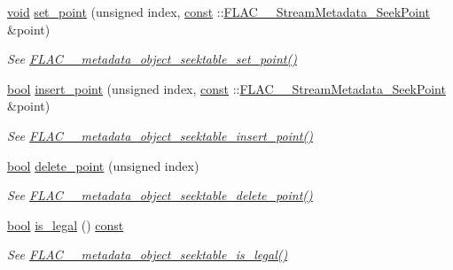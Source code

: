\begin{DoxyCompactItemize}
\hyperlink{sound_8c_ae35f5844602719cf66324f4de2a658b3}{void} \hyperlink{class_f_l_a_c_1_1_metadata_1_1_seek_table_a992aa37cd6a781b3e1f64a2d1d982229}{set\+\_\+point} (unsigned index, \hyperlink{getopt1_8c_a2c212835823e3c54a8ab6d95c652660e}{const} \+::\hyperlink{struct_f_l_a_c_____stream_metadata___seek_point}{F\+L\+A\+C\+\_\+\+\_\+\+Stream\+Metadata\+\_\+\+Seek\+Point} \&point)
\begin{DoxyCompactList}\small\item\em See \hyperlink{group__flac__metadata__object_gae2c58ebdfb9f2b238d45971b14600944}{F\+L\+A\+C\+\_\+\+\_\+metadata\+\_\+object\+\_\+seektable\+\_\+set\+\_\+point()} \end{DoxyCompactList}\item 
\hyperlink{mac_2config_2i386_2lib-src_2libsoxr_2soxr-config_8h_abb452686968e48b67397da5f97445f5b}{bool} \hyperlink{class_f_l_a_c_1_1_metadata_1_1_seek_table_a688ee146faf497ef96e953008adcc95a}{insert\+\_\+point} (unsigned index, \hyperlink{getopt1_8c_a2c212835823e3c54a8ab6d95c652660e}{const} \+::\hyperlink{struct_f_l_a_c_____stream_metadata___seek_point}{F\+L\+A\+C\+\_\+\+\_\+\+Stream\+Metadata\+\_\+\+Seek\+Point} \&point)
\begin{DoxyCompactList}\small\item\em See \hyperlink{group__flac__metadata__object_ga0c658260aaffb126486f5d1e211b53e5}{F\+L\+A\+C\+\_\+\+\_\+metadata\+\_\+object\+\_\+seektable\+\_\+insert\+\_\+point()} \end{DoxyCompactList}\item 
\hyperlink{mac_2config_2i386_2lib-src_2libsoxr_2soxr-config_8h_abb452686968e48b67397da5f97445f5b}{bool} \hyperlink{class_f_l_a_c_1_1_metadata_1_1_seek_table_af5962d076051a3e46379475c3f2b4fa8}{delete\+\_\+point} (unsigned index)
\begin{DoxyCompactList}\small\item\em See \hyperlink{group__flac__metadata__object_ga5a865f792845cbf22b5935c3d96568d1}{F\+L\+A\+C\+\_\+\+\_\+metadata\+\_\+object\+\_\+seektable\+\_\+delete\+\_\+point()} \end{DoxyCompactList}\item 
\hyperlink{mac_2config_2i386_2lib-src_2libsoxr_2soxr-config_8h_abb452686968e48b67397da5f97445f5b}{bool} \hyperlink{class_f_l_a_c_1_1_metadata_1_1_seek_table_aa98d82380ed3c33e1090edbf444fa280}{is\+\_\+legal} () \hyperlink{getopt1_8c_a2c212835823e3c54a8ab6d95c652660e}{const} 
\begin{DoxyCompactList}\small\item\em See \hyperlink{group__flac__metadata__object_ga08f33e2ef85d72363dda82de3208ed1e}{F\+L\+A\+C\+\_\+\+\_\+metadata\+\_\+object\+\_\+seektable\+\_\+is\+\_\+legal()} \end{DoxyCompactList}\item 

\end{DoxyCompactItemize}
